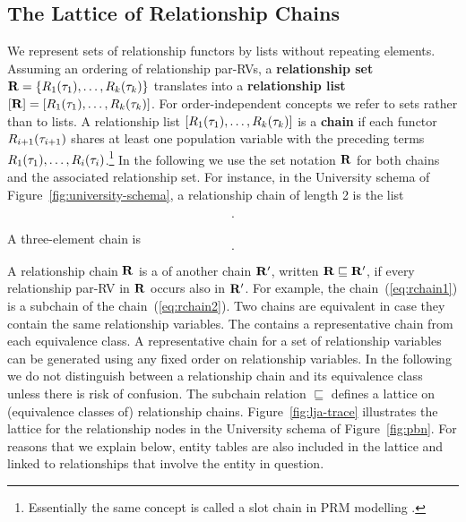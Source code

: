 \subsection{The Lattice of Relationship Chains} 
We represent sets of relationship functors by lists without repeating elements. Assuming an ordering of relationship par-RVs, a \textbf{relationship set} $\mathbf{R} = \{R_{1}(\mathbf{\tau}_{1}),\ldots,R_{k}(\mathbf{\tau}_{k})\}$ translates into a \textbf{relationship list} $[\mathbf{R}]=[R_{1}(\mathbf{\tau}_{1}),\ldots,R_{k}(\mathbf{\tau}_{k})]$. For order-independent concepts we refer to sets rather than to lists.
A relationship list $[R_{1}(\mathbf{\tau}_{1}),\ldots,R_{k}(\mathbf{\tau}_{k})]$ is a \textbf{chain} if each functor $R_{i+1}(\mathbf{\tau}_{i+1})$ shares at least one population variable with the preceding terms $R_{1}(\mathbf{\tau}_{1}),\ldots,R_{i}(\mathbf{\tau}_{i})$.\footnote{Essentially the same concept is called a slot chain in PRM modelling \cite{Getoor2007c}.} In the following we use the set notation $\mathbf{R}$ for both chains and the associated relationship set. %
For instance, in the University schema of Figure~\ref{fig:university-schema}, a relationship 
chain of length 2 is the list 

\begin{equation}
[\it{RA}(\P,\S),\it{Registered}(\S,\C)]. \label{eq:rchain1}
\end{equation} 

A three-element chain is 
\begin{equation}
[\it{RA}(\P,\S),\it{Registered}(\S,\C),\it{TA}(\C,S)]. \label{eq:rchain2}
\end{equation}

 A relationship chain $\mathbf{R}$ is a  of another chain $\mathbf{R'}$, written $\mathbf{R} \sqsubseteq \mathbf{R'}$, if every relationship par-RV in $\mathbf{R}$ occurs also in $\mathbf{R'}$. For example, the chain~(\ref{eq:rchain1}) is a subchain of the chain~(\ref{eq:rchain2}).
Two chains are equivalent in case they contain the same relationship variables. 
The  contains a representative chain from each equivalence class. A representative chain for a set of relationship variables can be generated using any fixed order on relationship variables. In the following we do not distinguish between a relationship chain and its equivalence class unless there is risk of confusion.  The
subchain relation $\sqsubseteq$ defines a lattice on (equivalence classes of) relationship chains. Figure~\ref{fig:lja-trace} illustrates the  lattice for the relationship nodes in the University schema of Figure~\ref{fig:pbn}. For reasons that we explain below, entity tables are also included in the lattice and linked to relationships that involve the entity in question. 




